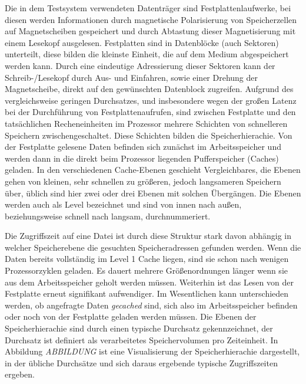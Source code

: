\documentclass[
	12pt,
	a4paper,
	BCOR10mm,
	DIV14,
	listof=totoc,
	bibliography=totoc,
	headsepline
]{scrreprt}
\begin{document}
Die in dem Testsystem verwendeten Datenträger sind Festplattenlaufwerke, bei diesen werden Informationen durch magnetische Polarisierung von Speicherzellen auf Magnetscheiben gespeichert und durch Abtastung dieser Magnetisierung mit einem Lesekopf ausgelesen.
Festplatten sind in Datenblöcke (auch Sektoren) unterteilt, diese bilden die kleinste Einheit, die auf dem Medium abgespeichert werden kann. Durch eine eindeutige Adressierung dieser Sektoren kann der Schreib-/Lesekopf durch Aus- und Einfahren, sowie einer Drehung der Magnetscheibe, direkt auf den gewünschten Datenblock zugreifen.
Aufgrund des vergleichsweise geringen Durchsatzes, und insbesondere wegen der großen Latenz bei der Durchführung von Festplattenaufrufen, sind zwischen Festplatte und den tatsächlichen Recheneinheiten im Prozessor mehrere Schichten von schnelleren Speichern zwischengeschaltet. Diese Schichten bilden die Speicherhierachie.
Von der Festplatte gelesene Daten befinden sich zunächst im Arbeitsspeicher und werden dann in die direkt beim Prozessor liegenden Pufferspeicher (Caches) geladen.
In den verschiedenen Cache-Ebenen geschieht Vergleichbares, die Ebenen gehen von kleinen, sehr schnellen zu größeren, jedoch langsameren Speichern über, üblich sind hier zwei oder drei Ebenen mit solchen Übergängen. Die Ebenen werden auch als Level bezeichnet und sind von innen nach außen, beziehungsweise schnell nach langsam, durchnummeriert. 
\medskip

Die Zugriffszeit auf eine Datei ist durch diese Struktur stark davon abhängig in welcher Speicherebene die gesuchten Speicheradressen gefunden werden. Wenn die Daten bereits vollständig im Level 1 Cache liegen, sind sie schon nach wenigen Prozessorzyklen geladen. Es dauert mehrere Größenordnungen länger wenn sie aus dem Arbeitsspeicher geholt werden müssen. Weiterhin ist das Lesen von der Festplatte erneut signifikant aufwendiger. Im Wesentlichen kann unterschieden werden, ob angefragte Daten \textit{gecached} sind, sich also im Arbeitsspeicher befinden oder noch von der Festplatte geladen werden müssen.
Die Ebenen der Speicherhierachie sind durch einen typische Durchsatz gekennzeichnet, der Durchsatz ist definiert als verarbeitetes Speichervolumen pro Zeiteinheit. 
In Abbildung \textit{ABBILDUNG} ist eine Visualisierung der Speicherhierachie dargestellt, in der übliche Durchsätze und sich daraus ergebende typische Zugriffszeiten ergeben.
\medskip
\end{document}
